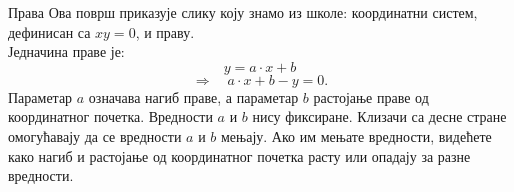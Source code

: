 \begin{surferPage}{Права}
Ова површ приказује слику коју знамо из школе: координатни систем, дефинисан са $xy=0$, и праву. \\Једначина праве је:
\[y=a\cdot x + b\]
\[ \Rightarrow \quad a\cdot x +b -y=0.\]
Параметар  $a$ означава нагиб праве, а параметар  $b$ растојање праве од координатног почетка.
\newline \newline
Вредности  $a$ и $b$ нису фиксиране. Клизачи са десне стране омогућавају да се вредности $a$ и $b$ мењају. Ако им мењате вредности, видећете како нагиб и растојање од координатног почетка расту или опадају за разне вредности.
\end{surferPage}
